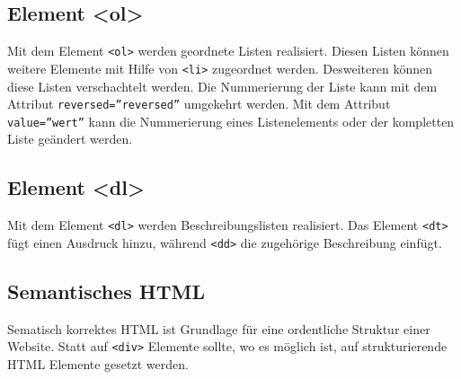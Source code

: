 \subsection{Element <ol>}
Mit dem Element \texttt{<ol>} werden geordnete Listen realisiert. Diesen Listen können weitere Elemente mit Hilfe von \texttt{<li>} zugeordnet werden. Desweiteren können diese Listen verschachtelt werden. Die Nummerierung der Liste kann mit dem Attribut \texttt{reversed=''reversed''} umgekehrt werden. Mit dem Attribut \texttt{value=''wert''} kann die Nummerierung eines Listenelements oder der kompletten Liste geändert werden.
\subsection{Element <dl>}
Mit dem Element \texttt{<dl>} werden Beschreibungslisten realisiert. Das Element \texttt{<dt>} fügt einen Ausdruck hinzu, während \texttt{<dd>} die zugehörige Beschreibung einfügt.
\subsection{Semantisches HTML}
Sematisch korrektes HTML ist Grundlage für eine ordentliche Struktur einer Website. Statt auf \texttt{<div>} Elemente sollte, wo es möglich ist, auf strukturierende HTML Elemente gesetzt werden.

